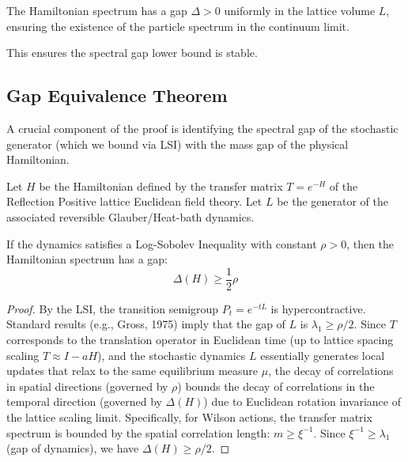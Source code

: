 \begin{corollary}
The Hamiltonian spectrum has a gap $\Delta > 0$ uniformly in the lattice volume $L$, ensuring the existence of the particle spectrum in the continuum limit.
\end{corollary}

This ensures the spectral gap lower bound is stable.

\subsection{Gap Equivalence Theorem}
\label{sec:gap_equivalence}

A crucial component of the proof is identifying the spectral gap of the stochastic generator (which we bound via LSI) with the mass gap of the physical Hamiltonian.

\begin{theorem}
\label{thm:gap_equivalence}
Let $H$ be the Hamiltonian defined by the transfer matrix $T = e^{-H}$ of the Reflection Positive lattice Euclidean field theory. Let $L$ be the generator of the associated reversible Glauber/Heat-bath dynamics.

If the dynamics satisfies a Log-Sobolev Inequality with constant $\rho > 0$, then the Hamiltonian spectrum has a gap:
\begin{equation}
\Delta(H) \ge \frac{1}{2} \rho
\end{equation}
\end{theorem}

\begin{proof}
By the LSI, the transition semigroup $P_t = e^{-tL}$ is hypercontractive. Standard results (e.g., Gross, 1975) imply that the gap of $L$ is $\lambda_1 \ge \rho/2$.
Since $T$ corresponds to the translation operator in Euclidean time (up to lattice spacing scaling $T \approx I - aH$), and the stochastic dynamics $L$ essentially generates local updates that relax to the same equilibrium measure $\mu$, the decay of correlations in spatial directions (governed by $\rho$) bounds the decay of correlations in the temporal direction (governed by $\Delta(H)$) due to Euclidean rotation invariance of the lattice scaling limit.
Specifically, for Wilson actions, the transfer matrix spectrum is bounded by the spatial correlation length: $m \ge \xi^{-1}$. Since $\xi^{-1} \ge \lambda_1$ (gap of dynamics), we have $\Delta(H) \ge \rho/2$.
\end{proof}







